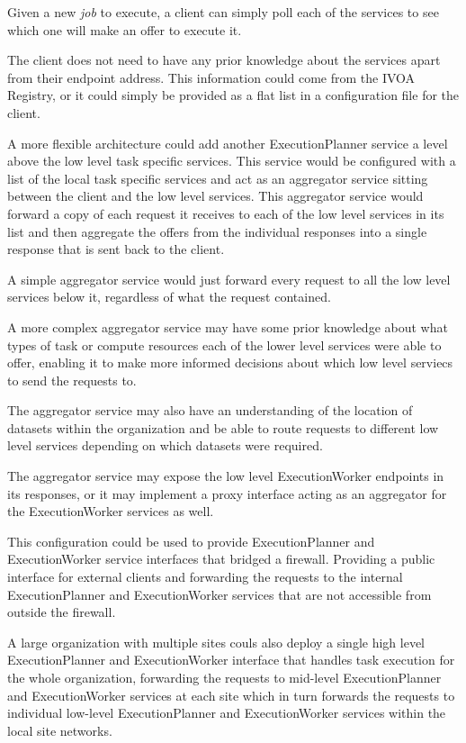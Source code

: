 \documentclass[11pt,a4paper]{ivoa}
\newcommand{\ivoa} {IVOA}
\newcommand{\execplanner} {ExecutionPlanner}
\newcommand{\execworker} {ExecutionWorker}
\newcommand{\dataset} {dataset}
\newcommand{\job} {\textit{job}}
\begin{document}
Given a new \job{} to execute, a client can simply poll each of the services to see which one will
make an offer to execute it.

The client does not need to have any prior knowledge about the services apart from their
endpoint address.
This information could come from the \ivoa{} Registry, or it could simply
be provided as a flat list in a configuration file for the client.

A more flexible architecture could add another \execplanner{} service
a level above the low level task specific services.
This service would be configured with a list of the local task specific services
and act as an aggregator service sitting between the client and the low level services.
This aggregator service would forward a copy of each request it receives to each of the low level services in its list and
then aggregate the offers from the individual responses into a single response that is sent back to the client.

A simple aggregator service would just forward every request to all the low level services below it,
regardless of what the request contained.

A more complex aggregator service may have some prior knowledge about what types of task or compute resources
each of the lower level services were able to offer, enabling it to make more informed decisions about
which low level serviecs to send the requests to.

The aggregator service may also have an understanding of the location of \dataset{}s within the organization and
be able to route requests to different low level services depending on which \dataset{}s were required.

The aggregator service may expose the low level \execworker{} endpoints in its responses,
or it may implement a proxy interface acting as an aggregator for the \execworker{}
services as well.

This configuration could be used to provide \execplanner{} and \execworker{} service interfaces
that bridged a firewall. Providing a public interface for external clients and forwarding the requests
to the internal \execplanner{} and \execworker{} services that are not accessible from outside the
firewall.

A large organization with multiple sites couls also deploy a single high level \execplanner{} and \execworker{}
interface that handles task execution for the whole organization, forwarding the requests to mid-level
\execplanner{} and \execworker{} services at each site which in turn forwards the requests to
individual low-level \execplanner{} and \execworker{} services within the local site networks.
\end{document}
